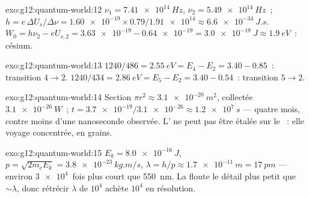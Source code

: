 \begin{solution}{exo:g12:quantum-world:12}
$\nu_1 = \qty{7.41e14}{Hz}$, $\nu_2 = \qty{5.49e14}{Hz}$~;
$h = e\,\Delta U_s/\Delta\nu = \num{1.60e-19} \times 0.79 /
\num{1.91e14} \approx \qty{6.6e-34}{J.s}$. $W_0 = h\nu_2 - eU_{s,2} =
\num{3.63e-19} - \num{0.64e-19} = \qty{3.0e-19}{J} \approx
\qty{1.9}{eV}$~: césium.
\end{solution}

\begin{solution}{exo:g12:quantum-world:13}
$1240/486 = \qty{2.55}{eV} = E_4 - E_2 = 3.40 - 0.85$~: transition
$4 \to 2$. $1240/434 = \qty{2.86}{eV} = E_5 - E_2 = 3.40 - 0.54$~:
transition $5 \to 2$.
\end{solution}

\begin{solution}{exo:g12:quantum-world:14}
Section $\pi r^2 \approx \qty{3.1e-20}{m^2}$,
 collectée $\qty{3.1e-26}{W}$~;
$t = \num{3.7e-19}/\num{3.1e-26} \approx \qty{1.2e7}{s}$ --- quatre
mois, contre moins d'une nanoseconde observée.
L' ne peut pas être étalée sur le
~: elle voyage concentrée, en grains.
\end{solution}

\begin{solution}{exo:g12:quantum-world:15}
$E_k = \qty{8.0e-16}{J}$, $p = \sqrt{2m_e E_k} =
\qty{3.8e-23}{kg.m/s}$, $\lambda = h/p \approx \qty{1.7e-11}{m} =
\qty{17}{pm}$ --- environ $\num{3e4}$~fois plus court que
\qty{550}{nm}. La  floute le détail
plus petit que $\sim\lambda$, donc rétrécir $\lambda$ de $10^4$
achète $10^4$ en résolution.
\end{solution}

